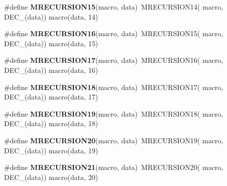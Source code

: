 \begin{DoxyCompactItemize}
\item 
\hypertarget{group__group__sam0__utils__mrecursion_ga5c619eed1b00d3df2ce0cc6335cfc3ad}{}\#define {\bfseries M\+R\+E\+C\+U\+R\+S\+I\+O\+N15}(macro,  data)~M\+R\+E\+C\+U\+R\+S\+I\+O\+N14(  macro, D\+E\+C\+\_\+(data))   macro(data, 14)\label{group__group__sam0__utils__mrecursion_ga5c619eed1b00d3df2ce0cc6335cfc3ad}

\item 
\hypertarget{group__group__sam0__utils__mrecursion_ga0a04774b719e39b0dc77ef3fd9013110}{}\#define {\bfseries M\+R\+E\+C\+U\+R\+S\+I\+O\+N16}(macro,  data)~M\+R\+E\+C\+U\+R\+S\+I\+O\+N15(  macro, D\+E\+C\+\_\+(data))   macro(data, 15)\label{group__group__sam0__utils__mrecursion_ga0a04774b719e39b0dc77ef3fd9013110}

\item 
\hypertarget{group__group__sam0__utils__mrecursion_gad2d391ce496952ee9fda6f54753643f9}{}\#define {\bfseries M\+R\+E\+C\+U\+R\+S\+I\+O\+N17}(macro,  data)~M\+R\+E\+C\+U\+R\+S\+I\+O\+N16(  macro, D\+E\+C\+\_\+(data))   macro(data, 16)\label{group__group__sam0__utils__mrecursion_gad2d391ce496952ee9fda6f54753643f9}

\item 
\hypertarget{group__group__sam0__utils__mrecursion_ga4aa4bb7bd93ea144f77973e50a8a2d2d}{}\#define {\bfseries M\+R\+E\+C\+U\+R\+S\+I\+O\+N18}(macro,  data)~M\+R\+E\+C\+U\+R\+S\+I\+O\+N17(  macro, D\+E\+C\+\_\+(data))   macro(data, 17)\label{group__group__sam0__utils__mrecursion_ga4aa4bb7bd93ea144f77973e50a8a2d2d}

\item 
\hypertarget{group__group__sam0__utils__mrecursion_ga27660e09d1b9282813ab1df951daf01e}{}\#define {\bfseries M\+R\+E\+C\+U\+R\+S\+I\+O\+N19}(macro,  data)~M\+R\+E\+C\+U\+R\+S\+I\+O\+N18(  macro, D\+E\+C\+\_\+(data))   macro(data, 18)\label{group__group__sam0__utils__mrecursion_ga27660e09d1b9282813ab1df951daf01e}

\item 
\hypertarget{group__group__sam0__utils__mrecursion_ga478355d5095a62f243dae4c9de56094c}{}\#define {\bfseries M\+R\+E\+C\+U\+R\+S\+I\+O\+N20}(macro,  data)~M\+R\+E\+C\+U\+R\+S\+I\+O\+N19(  macro, D\+E\+C\+\_\+(data))   macro(data, 19)\label{group__group__sam0__utils__mrecursion_ga478355d5095a62f243dae4c9de56094c}

\item 
\hypertarget{group__group__sam0__utils__mrecursion_ga077fdbda319ee988c77241afa1ff82f9}{}\#define {\bfseries M\+R\+E\+C\+U\+R\+S\+I\+O\+N21}(macro,  data)~M\+R\+E\+C\+U\+R\+S\+I\+O\+N20(  macro, D\+E\+C\+\_\+(data))   macro(data, 20)\label{group__group__sam0__utils__mrecursion_ga077fdbda319ee988c77241afa1ff82f9}


\end{DoxyCompactItemize}
